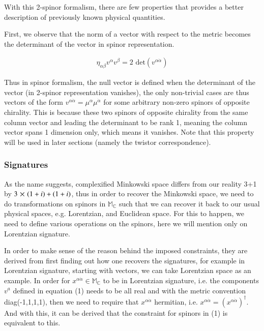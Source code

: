 \documentclass{article}
\begin{document}
 With this 2-spinor formalism, there are few properties that provides
 a better description of previously known physical quantities. 

 First, we observe that the norm of a vector with respect to the metric
 becomes the determinant of the vector in spinor representation.

\begin{align}
  \label{vector element det}
  \eta_{\alpha \beta} v^{\alpha} v^{\beta}  = 2 \text{  det}(v^{\alpha \dot{\alpha}})
\end{align}

Thus in spinor formalism, the null vector is defined when the
determinant of the vector (in 2-spinor representation vanishes),
the only non-trivial cases are thus vectors of the form $
v^{\alpha \dot{\alpha}} = \mu^{\alpha} \mu^{\dot{\alpha}} $ for some
arbitrary non-zero spinors of opposite chirality. This is because these two
spinors of opposite chirality from the
same column vector and leading the determinant to be rank 1, meaning the
column vector spans 1 dimension only, which means it
vanishes.
Note that this property will be used in later sections (namely
the twistor correspondence).   

\subsubsection{Signatures}%
  \label{sub:signature}
  As the name suggests, complexified Minkowski space differs from our
  reality 3+1 by $3 \cross (1 + i) + (1 + i)$, thus in order to recover
  the Minkowski space, we need to do transformations on spinors in $
  \mathbb{M_{C}} $ such that we can recover it back to our usual physical
  spaces, e.g. Lorentzian, and Euclidean space. For this to happen, we need to
  define various operations on the spinors, here we will mention only on
  Lorentzian signature. 


  In order to make sense of the reason behind the imposed constraints, they are
  derived from first finding out how one recovers the signatures, for
  example in Lorentzian signature,
  starting with vectors, we can take Lorentzian space as an example.
  In order for $ x^{\alpha \dot{\alpha}} \in \mathbb{M_{C}}  $ to be in
  Lorentzian signature, i.e. the components $ v^a $ defined in equation
  (1) needs to be all real and with the metric convention diag(-1,1,1,1),
  then we need to require that $ x^{\alpha \dot{\alpha}} $ hermitian,
  i.e. $ x^{\alpha \dot{\alpha}} = (x^{\alpha
  \dot{\alpha}})^{\dagger} $. And with this, it can be derived that the
  constraint for spinors in (1) is equivalent to this.
\end{document}
